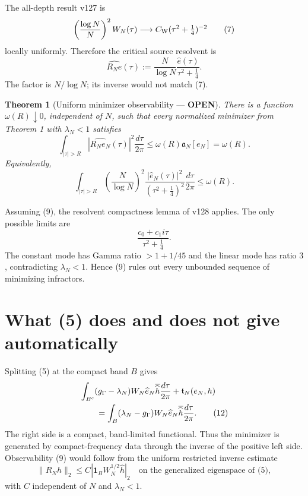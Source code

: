 \documentclass[11pt]{article}
\newcommand{\OPEN}{\textcolor{red!70!black}{\textbf{OPEN}}}
\newtheorem{theorem}{Theorem}
\begin{document}
The all-depth result v127 is
\begin{equation}
 \left(\frac{\log N}{N}\right)^2W_N(\tau)
 \longrightarrow
 C_{\rm W}(\tau^2+\tfrac14)^{-2}                           \tag{7}
\end{equation}
locally uniformly.  Therefore the critical source resolvent is
\begin{equation}
 \widehat{R_Ne}(\tau)
 :=\frac{N}{\log N}\frac{\widehat e(\tau)}
                         {\tau^2+\frac14}.                  \tag{8}
\end{equation}
The factor is $N/\log N$; its inverse would not match (7).

\begin{theorem}[Uniform minimizer observability --- \OPEN]
There is a function $\omega(R)\downarrow0$, independent of $N$, such that
every normalized minimizer from Theorem 1 with $\lambda_N<1$ satisfies
\begin{equation}
 \boxed{
 \int_{|\tau|>R}|\widehat{R_Ne_N}(\tau)|^2\frac{d\tau}{2\pi}
 \le\omega(R)\mathfrak a_N[e_N]=\omega(R).}               \tag{9}
\end{equation}
Equivalently,
\begin{equation}
 \int_{|\tau|>R}
 \left(\frac{N}{\log N}\right)^2
 \frac{|\widehat e_N(\tau)|^2}{(\tau^2+\frac14)^2}
 \frac{d\tau}{2\pi}\le\omega(R).                        \tag{10}
\end{equation}
\end{theorem}

Assuming (9), the resolvent compactness lemma of v128 applies.  The only
possible limits are
\begin{equation}
 \frac{c_0+c_1i\tau}{\tau^2+\frac14}.                      \tag{11}
\end{equation}
The constant mode has Gamma ratio $>1+1/45$ and the linear mode has ratio
$3$, contradicting $\lambda_N<1$.  Hence (9) rules out every unbounded
sequence of minimizing infractors.

\section{What (5) does and does not give automatically}

Splitting (5) at the compact band $B$ gives
\begin{align}
 &\int_{B^c}(g_\Gamma-\lambda_N)W_N
       \widehat e_N\overline{\widehat h}\frac{d\tau}{2\pi}
 +\mathfrak t_N(e_N,h)                                    \notag\\
 &\qquad=
 \int_B(\lambda_N-g_\Gamma)W_N
       \widehat e_N\overline{\widehat h}\frac{d\tau}{2\pi}.  \tag{12}
\end{align}
The right side is a compact, band-limited functional.  Thus the minimizer
is generated by compact-frequency data through the inverse of the
positive left side.  Observability (9) would follow from the uniform
restricted inverse estimate
\begin{equation}
 \boxed{
 \|R_Nh\|_2
 \le C\left|
  \mathbf1_BW_N^{1/2}\widehat h
 \right|_2
 \quad\text{on the generalized eigenspace of (5)},}       \tag{13}
\end{equation}
with $C$ independent of $N$ and $\lambda_N<1$.
\end{document}
